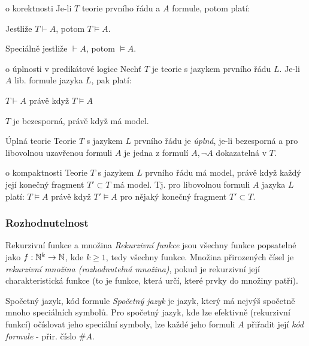 \begin{vetaN}{o korektnosti}
Je-li $T$ teorie prvního řádu a $A$ formule, potom platí:
\begin{penumerate}
    \item Jestliže $T\vdash A$, potom $T\models A$.
    \item Speciálně jestliže $\vdash A$, potom $\models A$.
\end{penumerate}
\end{vetaN}

\begin{vetaN}{o úplnosti v predikátové logice}
Nechť $T$ je teorie s jazykem prvního řádu $L$. Je-li $A$ lib. formule jazyka $L$, pak platí:
\begin{penumerate}
    \item $T\vdash A$ právě když $T\models A$
    \item $T$ je bezesporná, právě když má model.
\end{penumerate}
\end{vetaN}

\begin{definiceN}{Úplná teorie}
Teorie $T$ s jazykem $L$ prvního řádu je \emph{úplná}, je-li bezesporná a pro libovolnou uzavřenou formuli $A$ je jedna z formulí $A,\neg A$ dokazatelná v $T$.
\end{definiceN}

\begin{vetaN}{o kompaktnosti}
Teorie $T$ s jazykem $L$ prvního řádu má model, právě když každý její konečný fragment $T'\subset T$ má model. Tj. pro libovolnou formuli $A$ jazyka $L$ platí: $T\models A$ právě když $T'\models A$ pro nějaký konečný fragment $T'\subset T$.
\end{vetaN}

\subsubsection*{Rozhodnutelnost}

\begin{definiceN}{Rekurzivní funkce a množina}
\emph{Rekurzivní funkce} jsou všechny funkce popsatelné jako $f:\mathbb{N}^k\to\mathbb{N}$, kde $k\geq 1$, tedy všechny  funkce. Množina přirozených čísel je \emph{rekurzivní množina (rozhodnutelná množina)}, pokud je rekurzivní její charakteristická funkce (to je funkce, která určí, které prvky do množiny patří).
\end{definiceN}

\begin{definiceN}{Spočetný jazyk, kód formule}
\emph{Spočetný jazyk} je jazyk, který má nejvýš spočetně mnoho speciálních symbolů. Pro spočetný jazyk, kde lze efektivně (rekurzivní funkcí) očíslovat jeho speciální symboly, lze každé jeho formuli $A$ přiřadit její \emph{kód formule} - přir. číslo $\#A$.
\end{definiceN}

